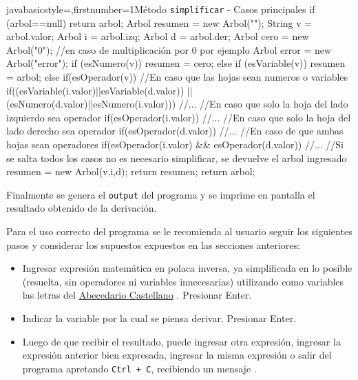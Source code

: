\documentclass[letterpaper,11pt]{article} %
\begin{document}
\begin{enumerate}
\begin{sourcecodep}[\label{codigo3}]{java}{basicstyle={\fontsize{9}{10}\selectfont\ttfamily},firstnumber=1}{Método \texttt{simplificar} - Casos principales}
		if (arbol==null) return arbol;
		Arbol resumen = new Arbol("");
		String v = arbol.valor;
		Arbol i = arbol.izq;
		Arbol d = arbol.der;
		Arbol cero = new Arbol("0"); //en caso de multiplicación por 0 por ejemplo
		Arbol error = new Arbol("error");
		if (esNumero(v)) resumen = cero;
		else if (esVariable(v))	resumen = arbol;
		else if(esOperador(v)){
			//En caso que las hojas sean numeros o variables
			if((esVariable(i.valor)||esVariable(d.valor)) || (esNumero(d.valor)||esNumero(i.valor))){ //...
			}
			//En caso que solo la hoja del lado izquierdo sea operador
			if(esOperador(i.valor)){ //...
			}
			//En caso que solo la hoja del lado derecho sea operador
			if(esOperador(d.valor)){ //...
			}
			//En caso de que ambas hojas sean operadores
			if(esOperador(i.valor) && esOperador(d.valor)){ //...
			}
			//Si se salta todos los casos no es necesario simplificar, se devuelve el arbol ingresado
			resumen = new Arbol(v,i,d);
			return resumen;
		}
		return arbol;
\end{sourcecodep}
\newp Finalmente se genera el \texttt{output} del programa y se imprime en pantalla el resultado obtenido de la derivación.

\end{enumerate}
\newpage
{}
Para el uso correcto del programa se le recomienda al usuario seguir los siguientes pasos y considerar los supuestos expuestos en las secciones anteriores:
\begin{itemize}
\item Ingresar expresión matemática en polaca inversa, ya simplificada en lo posible (resuelta, sin operadores ni variables innecesarias) utilizando como variables las letras del  \href{http://aliso.pntic.mec.es/agalle17/cultura_clasica/alfabetos.htm}{Abecedario Castellano} \cite{ref1}. Presionar Enter.
\item Indicar la variable por la cual se piensa derivar. Presionar Enter.
\item Luego de que recibir el resultado, puede ingresar otra expresión, ingresar la expresión anterior bien expresada, ingresar la misma expresión o salir del programa apretando \texttt{Ctrl + C}, recibiendo un mensaje . 
\end{itemize}
\end{document}
